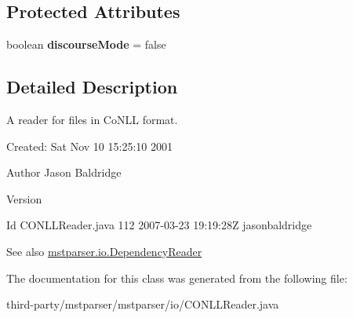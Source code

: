 \subsection*{Protected Attributes}
\begin{DoxyCompactItemize}
\item 
\hypertarget{classmstparser_1_1io_1_1CONLLReader_a6613a5db92c75663e4c004d1b645394e}{
boolean {\bfseries discourseMode} = false}
\label{classmstparser_1_1io_1_1CONLLReader_a6613a5db92c75663e4c004d1b645394e}

\end{DoxyCompactItemize}


\subsection{Detailed Description}
A reader for files in CoNLL format.

Created: Sat Nov 10 15:25:10 2001 

\begin{DoxyAuthor}{Author}
Jason Baldridge 
\end{DoxyAuthor}
\begin{DoxyVersion}{Version}

\end{DoxyVersion}
\begin{DoxyParagraph}{Id}
CONLLReader.java 112 2007-\/03-\/23 19:19:28Z jasonbaldridge 
\end{DoxyParagraph}
\begin{DoxySeeAlso}{See also}
\hyperlink{classmstparser_1_1io_1_1DependencyReader}{mstparser.io.DependencyReader} 
\end{DoxySeeAlso}


The documentation for this class was generated from the following file:\begin{DoxyCompactItemize}
\item 
third-\/party/mstparser/mstparser/io/CONLLReader.java\end{DoxyCompactItemize}
